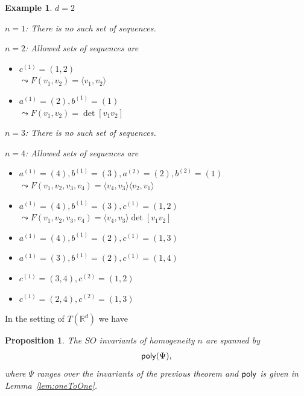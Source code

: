 \documentclass{scrartcl}
\theoremstyle{plain}
\newtheorem{example}[theorem]{Example}
\newtheorem{proposition}[theorem]{Proposition}
\theoremstyle{definition}
\newcommand{\R}{\mathbb{R}}
\newcommand{\1}[1]{1_{\{#1\}}}
\newcommand{\ds}{d} %
\newcommand{\TS}{T(\R^\ds)} %
\begin{document}
\begin{example}
  $\ds=2$

  $n=1$:
  There is no such set of sequences.

  $n=2$:
  Allowed sets of sequences are
  \begin{itemize}
    \item $c^{(1)} = (1,2)$\\
        $\leadsto F(v_1,v_2) = \langle v_1, v_2 \rangle$
    \item $a^{(1)} = (2), b^{(1)} = (1)$\\
      $\leadsto F(v_1,v_2) = \det[ v_1 v_2 ]$
  \end{itemize}

  $n=3$:
  There is no such set of sequences.

  $n=4$:
  Allowed sets of sequences are
  \begin{itemize}
    \item $a^{(1)} = (4), b^{(1)} = (3), a^{(2)} = (2), b^{(2)} = (1)$\\
      $\leadsto F(v_1,v_2,v_3,v_4) = \langle v_4, v_3 \rangle \langle v_2, v_1 \rangle$

    \item $a^{(1)} = (4), b^{(1)} = (3), c^{(1)} = (1,2)$\\
      $\leadsto F(v_1,v_2,v_3,v_4) = \langle v_4, v_3 \rangle \det[ v_1 v_2 ]$

    \item $a^{(1)} = (4), b^{(1)} = (2), c^{(1)} = (1,3)$

    \item $a^{(1)} = (3), b^{(1)} = (2), c^{(1)} = (1,4)$

    \item $c^{(1)} = (3,4), c^{(2)} = (1,2)$

    \item $c^{(1)} = (2,4), c^{(2)} = (1,3)$
  \end{itemize}
\end{example}



In the setting of $\TS$ we have
\begin{proposition}
  \label{prop:soInvariants}
  The $SO$ invariants of homogeneity $n$ are spanned by
  \begin{align*}
    \mathsf{poly}( \Psi ),
  \end{align*}
  where $\Psi$ ranges over the invariants of the previous theorem
  and $\mathsf{poly}$ is given in Lemma~\ref{lem:oneToOne}.
\end{proposition}
\end{document}

